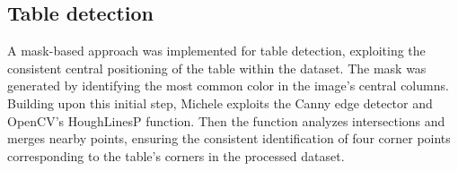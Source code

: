 \subsection{Table detection}

A mask-based approach was implemented for table detection, exploiting the consistent central positioning of the table within the dataset.  The mask was generated by identifying the most common color in the image's central columns.  Building upon this initial step, Michele exploits the Canny edge detector and OpenCV's HoughLinesP function. Then the function analyzes intersections and merges nearby points, ensuring the consistent identification of four corner points corresponding to the table's corners in the processed dataset.
